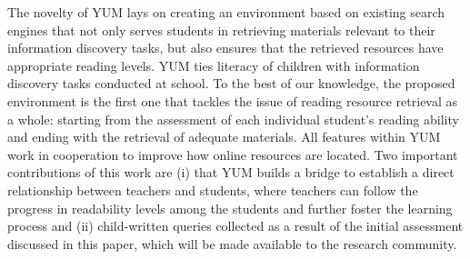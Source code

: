 \documentclass{sig-alternate-05-2015}
\begin{document}
The novelty of YUM lays on creating an environment based on existing search engines that not only serves students in retrieving materials relevant to their information discovery tasks, but also ensures that the retrieved resources have appropriate reading levels. YUM ties literacy of children with information discovery tasks conducted at school. To the best of our knowledge, the proposed environment is the first one that tackles the issue of reading resource retrieval as a whole: starting from the assessment of each individual student's reading ability and ending with the retrieval of adequate materials. All features within YUM work in cooperation to improve how online resources are located. Two important contributions of this work are (i) that YUM builds a bridge to establish a direct relationship between teachers and students, where teachers can follow the progress in readability levels among the students and further foster the learning process and (ii) child-written queries collected as a result of the initial assessment discussed in this paper, which will be made available to the research community.
\end{document}
